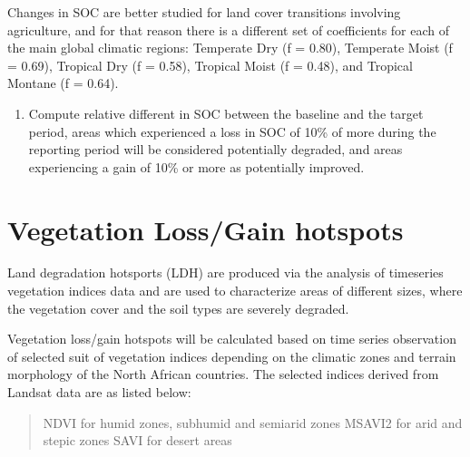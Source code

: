 \documentclass[letterpaper,10pt,english]{sphinxmanual}
\begin{document}

\sphinxAtStartPar
Changes in SOC are better studied for land cover transitions involving
agriculture, and for that reason there is a different set of coefficients for
each of the main global climatic regions: Temperate Dry (f = 0.80), Temperate
Moist (f = 0.69), Tropical Dry (f = 0.58), Tropical Moist (f = 0.48), and
Tropical Montane (f = 0.64).
\begin{enumerate}
%
\setcounter{enumi}{3}
\item {} 
\sphinxAtStartPar
Compute relative different in SOC between the baseline and the target
period, areas which experienced a loss in SOC of 10\% of more during the
reporting period will be considered potentially degraded, and areas
experiencing a gain of 10\% or more as potentially improved.

\end{enumerate}

\label{\detokenize{Background/SDG_indicators:indicator-land-cover}}
\sphinxstepscope


\chapter{Vegetation Loss/Gain hotspots}
\label{\detokenize{Background/vegetationloss:vegetation-loss-gain-hotspots}}\label{\detokenize{Background/vegetationloss::doc}}
\sphinxAtStartPar
Land degradation hotsports (LDH) are produced via the analysis of time\sphinxhyphen{}series vegetation indices data and are used to characterize areas of different sizes, where the vegetation cover and the soil types are severely degraded.

\sphinxAtStartPar
Vegetation loss/gain hotspots will be calculated based on time series observation of selected suit of vegetation indices depending on the climatic zones and terrain morphology of the North African countries. The selected indices derived from Landsat data are as listed below:
\begin{quote}

\sphinxAtStartPar
\sphinxhyphen{}NDVI for humid zones, sub\sphinxhyphen{}humid and semi\sphinxhyphen{}arid zones
\sphinxhyphen{}MSAVI2 for arid and stepic zones
\sphinxhyphen{}SAVI for desert areas
\end{quote}
\end{document}
